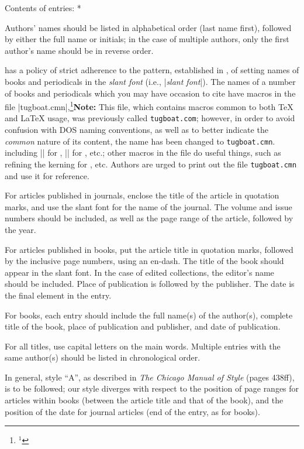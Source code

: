 \subsubhead * Contents of entries: *
 
Authors' names should be listed in alphabetical order (last name first),
followed by either the full name or initials; in the case of multiple
authors, only the first author's name should be in reverse order.
 
\TUB\/ has a policy of strict adherence to the pattern, established in
\TB, of setting names of books and periodicals in the {\sl slant font\/}
(i.e., |{\sl slant font\/}|).  The names of a number of books and
periodicals which you may have occasion to cite have macros in the file
|tugboat.cmn|,\footnote{$^1$}{{\bf Note:} This file, which contains
macros common to both \TeX{} and \LaTeX{} usage, was previously called
{\tt tugboat.com}; however, in order to avoid confusion with {\SMC DOS}
naming conventions, as well as to better indicate the {\it common\/}
nature of its content, the name has been changed to {\tt tugboat.cmn}.}
including |\TUB| for \TUB, |\TB| for \TB, etc.; other
macros in the file do useful things, such as refining the kerning for
\AW, etc.  Authors are urged to print out the file {\tt tugboat.cmn}
and use it for reference.
 
For articles published in journals, enclose the title of the article in
quotation marks, and use the slant font for the name of the journal.
The volume and issue numbers should be included, as well as the page
range of the article, followed by the year.
 
For articles published in books, put the article title in quotation
marks, followed by the inclusive page numbers, using an en-dash.  The
title of the book should appear in the slant font.  In the case of
edited collections, the editor's name should be included.  Place of
publication is followed by the publisher.  The date is the final element
in the entry.
 
For books, each entry should include the full name(s) of the author(s),
complete title of the book, place of publication and publisher, and date
of publication.
 
For all titles, use capital letters on the main words.  Multiple entries
with the same author(s) should be listed in chronological order.
 
In general, style ``A'', as described in {\sl The Chicago Manual of
Style\/} (pages 438ff), is to be followed; our style diverges with
respect to the position of page ranges for articles within books
(between the article title and that of the book), and the position of
the date for journal articles (end of the entry, as for books).
 
